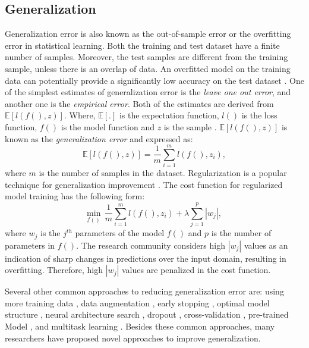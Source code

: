 \documentclass{article}
\begin{document}
\subsection{Generalization}
Generalization error is also known as the out-of-sample error or the overfitting error in statistical learning. Both the training and test dataset have a finite number of samples. Moreover, the test samples are different from the training sample, unless there is an overlap of data. An overfitted model on the training data can potentially provide a significantly low accuracy on the test dataset \cite{bousquet2002stability}. One of the simplest estimates of generalization error is the \emph{leave one out error}, and another one is the \emph{empirical error}. Both of the estimates are derived from $\mathbb{E}[l(f(),z)]$. Where,  $\mathbb{E} [.]$ is the expectation function, $l()$ is the loss function, $f()$ is the model function and $z$ is the sample \cite{bousquet2002stability}. $\mathbb{E}[l(f(),z)]$ is known as the \emph{generalization error} and expressed as:
\begin{equation}
\mathbb{E}[l(f(),z)] = \frac{1}{m} \sum_{i=1}^m l(f(),z_i),
        \label{GE_Eq1}
\end{equation}
where $m$ is the number of samples in the dataset. Regularization is a popular technique for generalization improvement \cite{micchelli2005learning}. The cost function for regularized model training has the following form: 
\begin{equation}
\underset{f()}{\text{min}} \ \ \frac{1}{m} \sum_{i=1}^m l(f(),z_i) + \lambda \sum_{j=1}^p |w_j|,
        \label{GE_Eq2}
\end{equation}
where $w_j$ is the $j^{th}$ parameters of the model $f()$ and $p$ is the number of parameters in $f()$. The research community considers high $|w_j|$ values as an indication of sharp changes in predictions over the input domain, resulting in overfitting. Therefore,  high $|w_j|$ values are penalized in the cost function.

Several other common approaches to reducing generalization error are: using more training data \cite{caruana2000overfitting}, data augmentation \cite{cubuk2019autoaugment}, early stopping \cite{caruana2000overfitting}, optimal model structure \cite{hernandez2023training}, neural architecture search \cite{pham2018efficient}, dropout \cite{gal2016dropout}, cross-validation \cite{efron1983estimating, krogh1994neural}, pre-trained Model \cite{kolesnikov2020big}, and multitask learning \cite{ndirango2019generalization}. Besides these common approaches, many researchers have proposed novel approaches to improve generalization. 
\end{document}
